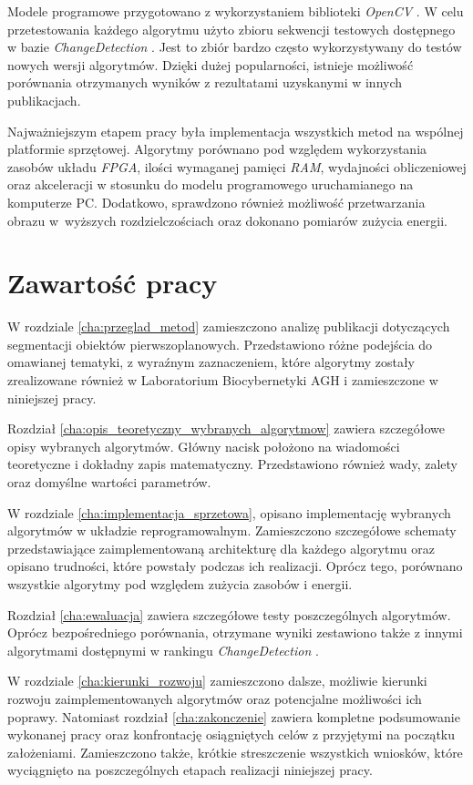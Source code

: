 Modele programowe przygotowano z wykorzystaniem biblioteki \textit{OpenCV} \cite{opencv_17}. 
W celu przetestowania każdego algorytmu użyto zbioru sekwencji testowych dostępnego w bazie \textit{ChangeDetection} \cite{change_detection_web}. 
Jest to zbiór bardzo często wykorzystywany do testów nowych wersji algorytmów. 
Dzięki dużej popularności, istnieje możliwość porównania otrzymanych wyników z rezultatami uzyskanymi w innych publikacjach. 

Najważniejszym etapem pracy była implementacja wszystkich metod na wspólnej platformie sprzętowej. 
Algorytmy porównano pod względem wykorzystania zasobów układu \textit{FPGA}, ilości wymaganej pamięci \textit{RAM}, wydajności obliczeniowej oraz akceleracji w stosunku do modelu programowego uruchamianego na komputerze PC. 
Dodatkowo, sprawdzono również możliwość przetwarzania obrazu w~wyższych rozdzielczościach oraz dokonano pomiarów zużycia energii.


\section{Zawartość pracy}
\label{sec:wprowadzenie_zawartosc_pracy}

W rozdziale \ref{cha:przeglad_metod} zamieszczono analizę publikacji dotyczących segmentacji obiektów pierwszoplanowych. 
Przedstawiono różne podejścia do omawianej tematyki, z wyraźnym zaznaczeniem, które algorytmy zostały zrealizowane również w Laboratorium Biocybernetyki AGH i zamieszczone w niniejszej pracy.

Rozdział \ref{cha:opis_teoretyczny_wybranych_algorytmow} zawiera szczegółowe opisy wybranych algorytmów. 
Główny nacisk położono na wiadomości teoretyczne i dokładny zapis matematyczny. 
Przedstawiono również wady, zalety oraz domyślne wartości parametrów.

W rozdziale \ref{cha:implementacja_sprzetowa}, opisano implementację wybranych algorytmów w układzie reprogramowalnym. 
Zamieszczono szczegółowe schematy przedstawiające zaimplementowaną architekturę dla każdego algorytmu oraz opisano trudności, które powstały podczas ich realizacji. 
Oprócz tego, porównano wszystkie algorytmy pod względem zużycia zasobów i energii.

Rozdział \ref{cha:ewaluacja} zawiera szczegółowe testy poszczególnych algorytmów. 
Oprócz bezpośredniego porównania, otrzymane wyniki zestawiono także z innymi algorytmami dostępnymi w rankingu \textit{ChangeDetection} \cite{change_detection_web}.

W rozdziale \ref{cha:kierunki_rozwoju} zamieszczono dalsze, możliwie kierunki rozwoju zaimplementowanych algorytmów oraz potencjalne możliwości ich poprawy. 
Natomiast rozdział \ref{cha:zakonczenie} zawiera kompletne podsumowanie wykonanej pracy oraz konfrontację osiągniętych celów z przyjętymi na początku założeniami. 
Zamieszczono także, krótkie streszczenie wszystkich wniosków, które wyciągnięto na poszczególnych etapach realizacji niniejszej pracy.

